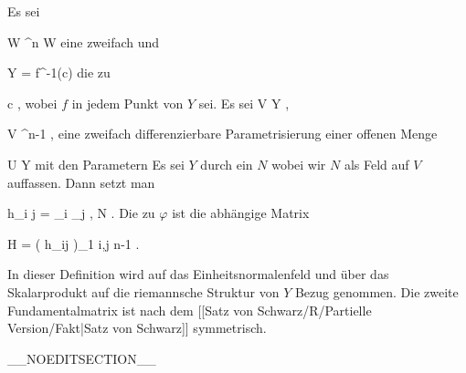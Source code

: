 {}
{

Es sei

\mavergleichskette
{\vergleichskette
{ W
}
{ \subseteq }{ \R^n
}
{  }{
}
{    }{
}
{   }{
}
}
{}{}{}
 { W } { \R
} {}
eine zweifach
und

\mavergleichskette
{\vergleichskette
{ Y
}
{ = }{ f^{-1}(c)
}
{  }{
}
{    }{
}
{   }{
}
}
{}{}{}
die
zu

\mavergleichskette
{\vergleichskette
{ c
}
{ \in }{ \R
}
{  }{
}
{    }{
}
{   }{
}
}
{}{}{,}
wobei $f$ in jedem Punkt von $Y$
sei. Es sei
\maabbdisp {\varphi} { V } { Y
} {,}

\mavergleichskette
{\vergleichskette
{ V
}
{ \subseteq }{ \R^{n-1}
}
{  }{
}
{    }{
}
{   }{
}
}
{}{}{,}
eine zweifach differenzierbare Parametrisierung einer offenen Menge

\mavergleichskette
{\vergleichskette
{ U
}
{ \subseteq }{ Y
}
{  }{
}
{    }{
}
{   }{
}
}
{}{}{}
mit den Parametern
 Es sei $Y$ durch ein
$N$
wobei wir $N$ als Feld auf $V$ auffassen. Dann setzt man

\mavergleichskettedisp
{\vergleichskette
{ h_{i j}
}
{ =} { \left\langle  \partial_i \partial_j \varphi , N  \right\rangle
}
{ } {
}
{ } {
}
{ } {
}
}
{}{}{.}
Die
zu $\varphi$ ist die
 {} {}
abhängige Matrix

\mavergleichskettedisp
{\vergleichskette
{ H
}
{ =} { \left(  h_{ij}   \right)_{1 \leq i,j \leq n-1}
}
{ } {
}
{ } {
}
{ } {
}
}
{}{}{.}

}

In dieser Definition wird auf das Einheitsnormalenfeld und über das Skalarprodukt auf die riemannsche Struktur von $Y$ Bezug genommen. Die zweite Fundamentalmatrix ist nach
dem [[Satz von Schwarz/R/Partielle Version/Fakt|Satz von Schwarz]]
symmetrisch.

__NOEDITSECTION__

